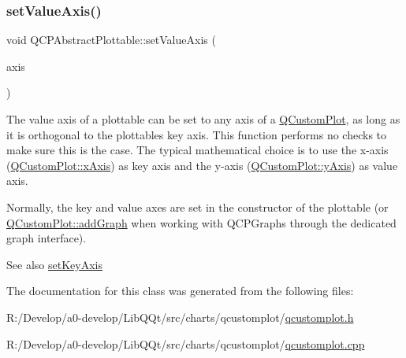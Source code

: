 \subsubsection{\texorpdfstring{set\+Value\+Axis()}{setValueAxis()}}
{\footnotesize\ttfamily void Q\+C\+P\+Abstract\+Plottable\+::set\+Value\+Axis (\begin{DoxyParamCaption}\item[{\mbox{\hyperlink{class_q_c_p_axis}{Q\+C\+P\+Axis}} $\ast$}]{axis }\end{DoxyParamCaption})}

The value axis of a plottable can be set to any axis of a \mbox{\hyperlink{class_q_custom_plot}{Q\+Custom\+Plot}}, as long as it is orthogonal to the plottable\textquotesingle{}s key axis. This function performs no checks to make sure this is the case. The typical mathematical choice is to use the x-\/axis (\mbox{\hyperlink{class_q_custom_plot_a9a79cd0158a4c7f30cbc702f0fd800e4}{Q\+Custom\+Plot\+::x\+Axis}}) as key axis and the y-\/axis (\mbox{\hyperlink{class_q_custom_plot_af6fea5679725b152c14facd920b19367}{Q\+Custom\+Plot\+::y\+Axis}}) as value axis.

Normally, the key and value axes are set in the constructor of the plottable (or \mbox{\hyperlink{class_q_custom_plot_a6fb2873d35a8a8089842d81a70a54167}{Q\+Custom\+Plot\+::add\+Graph}} when working with Q\+C\+P\+Graphs through the dedicated graph interface).

\begin{DoxySeeAlso}{See also}
\mbox{\hyperlink{class_q_c_p_abstract_plottable_a8524fa2994c63c0913ebd9bb2ffa3920}{set\+Key\+Axis}} 
\end{DoxySeeAlso}


The documentation for this class was generated from the following files\+:\begin{DoxyCompactItemize}
\item 
R\+:/\+Develop/a0-\/develop/\+Lib\+Q\+Qt/src/charts/qcustomplot/\mbox{\hyperlink{qcustomplot_8h}{qcustomplot.\+h}}\item 
R\+:/\+Develop/a0-\/develop/\+Lib\+Q\+Qt/src/charts/qcustomplot/\mbox{\hyperlink{qcustomplot_8cpp}{qcustomplot.\+cpp}}\end{DoxyCompactItemize}
